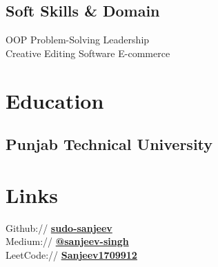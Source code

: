 \documentclass[]{deedy-resume-reversed}
\begin{document}
\begin{minipage}[t]{0.33\textwidth}
\subsection{Soft Skills \& Domain}
OOP \textbullet{} Problem-Solving \textbullet{} Leadership \\
Creative Editing Software \textbullet{} E-commerce \\
\sectionsep


\section{Education}

\subsection{Punjab Technical \newline University}
\sectionsep


\section{Links}
Github:// \href{https://github.com/sudo-sanjeev}{\bf sudo-sanjeev} \\
Medium://  \href{https://medium.com/@sanjeev-singh}{\bf @sanjeev-singh} \\
LeetCode://  \href{https://leetcode.com/u/Sanjeev1709912/}{\bf Sanjeev1709912}
\sectionsep

\end{minipage}
\end{document}
